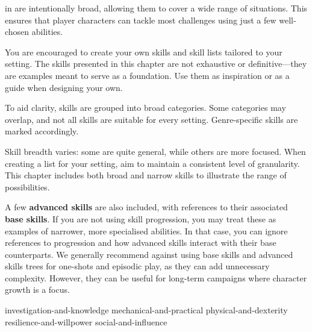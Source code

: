  in \wyrd{} are intentionally broad, allowing them to cover a wide range of situations. This ensures that player characters can tackle most challenges using just a few well-chosen abilities.

You are encouraged to create your own skills and skill lists tailored to your setting. The skills presented in this chapter are not exhaustive or definitive—they are examples meant to serve as a foundation. Use them as inspiration or as a guide when designing your own.

To aid clarity, skills are grouped into broad categories. Some categories may overlap, and not all skills are suitable for every setting. Genre-specific skills are marked accordingly.

Skill breadth varies: some are quite general, while others are more focused. When creating a list for your setting, aim to maintain a consistent level of granularity. This chapter includes both broad and narrow skills to illustrate the range of possibilities.

A few \textbf{advanced skills} are also included, with references to their associated \textbf{base skills}. If you are not using skill progression, you may treat these as examples of narrower, more specialised abilities. In that case, you can ignore references to progression and how advanced skills interact with their base counterparts. We generally recommend against using base skills and advanced skills trees for one-shots and episodic play, as they can add unnecessary complexity. However, they can be useful for long-term campaigns where character growth is a focus.


{investigation-and-knowledge}
{mechanical-and-practical}
{physical-and-dexterity}
{resilience-and-willpower}
{social-and-influence}
